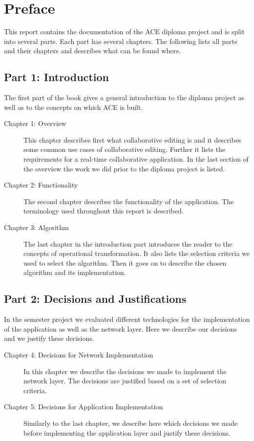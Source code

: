 \chapter{Preface}
\label{chapter:preface}

This report contains the documentation
of the ACE diploma project and is split into several parts. Each part has
several chapters. The following lists all parts and their chapters and
describes what can be found where.



\section*{Part 1: Introduction}
The first part of the book gives a general introduction to the diploma
project as well as to the concepts on which ACE is built.

\begin{description}
 \item[Chapter 1: Overview] This chapter describes first what collaborative editing is and it describes some common use cases of collaborative editing. Further it lists the requirements for a real-time collaborative application. In the last section of the overview the work we did prior to the diploma project is listed.
 \item[Chapter 2: Functionality] The second chapter describes the functionality of the application. The terminology used throughout this report is described.
 \item[Chapter 3: Algorithm] The last chapter in the introduction part introduces the reader to the concepts of operational transformation. It also lists the selection criteria we used to select the algorithm. Then it goes on to describe the chosen algorithm and its implementation. 
\end{description}


\section*{Part 2: Decisions and Justifications}
In the semester project we evaluated different technologies for the
implementation of the application as well as the network layer. Here we 
describe our decisions and we justify these decisions.

\begin{description}
 \item[Chapter 4: Decisions for Network Implementation] In this chapter we describe the decisions we made to implement the network layer. The decisions are justified based on a set of selection criteria.
 \item[Chapter 5: Decisions for Application Implementation] Similarly to the last chapter, we describe here which decisions we made before implementing the application layer and justify these decisions.
\end{description}

